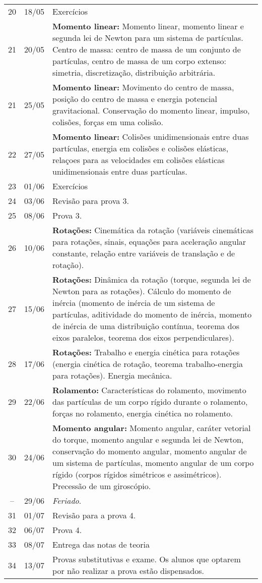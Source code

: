 \begin{center}
\begin{longtable}{ccp{70mm}}
 20 & 18/05 & Exercícios \\
 21 & 20/05 & \textbf{Momento linear:} Momento linear, momento linear e segunda lei de Newton para um sistema de partículas. Centro de massa: centro de massa de um conjunto de partículas, centro de massa de um corpo extenso: simetria, discretização, distribuição arbitrária. \\
 21 & 25/05 & \textbf{Momento linear:} Movimento do centro de massa, posição do centro de massa e energia potencial gravitacional. Conservação do momento linear, impulso, colisões, forças em uma colisão. \\
 22 & 27/05 & \textbf{Momento linear:} Colisões unidimensionais entre duas partículas, energia em colisões e colisões elásticas, relaçoes para as velocidades em colisões elásticas unidimensionais entre duas partículas. \\ 
 23 & 01/06 & Exercícios \\
 24 & 03/06 & Revisão para prova 3. \\
 25 & 08/06 & Prova 3. \\
 26 & 10/06 & \textbf{Rotações:} Cinemática da rotação (variáveis cinemáticas para rotações, sinais, equações para aceleração angular constante, relação entre variáveis de translação e de rotação). \\
 27 & 15/06 & \textbf{Rotações:} Dinâmica da rotação (torque, segunda lei de Newton para as rotações). Cálculo do momento de inércia (momento de inércia de um sistema de partículas, aditividade do momento de inércia, momento de inércia de uma distribuição contínua, teorema dos eixos paralelos, teorema dos eixos perpendiculares). \\
 28 & 17/06 & \textbf{Rotações:} Trabalho e energia cinética para rotações (energia cinética de rotação, teorema trabalho-energia para rotações). Energia mecânica. \\
 29 & 22/06 & \textbf{Rolamento:} Características do rolamento, movimento das partículas de um corpo rígido durante o rolamento, forças no rolamento, energia cinética no rolamento. \\
 30 & 24/06 & \textbf{Momento angular:} Momento angular, caráter vetorial do torque, momento angular e segunda lei de Newton, conservação do momento angular, momento angular de um sistema de partículas, momento angular de um corpo rígido (corpos rígidos simétricos e assimétricos). Precessão de um giroscópio. \\
 -- & 29/06 & \emph{Feriado}. \\
 31 & 01/07 & Revisão para a prova 4. \\
 32 & 06/07 & Prova 4. \\
 33 & 08/07 & Entrega das notas de teoria \\
 34 & 13/07 & Provas substitutivas e exame. Os alunos que optarem por não realizar a prova estão dispensados.
\end{longtable}
\end{center}
\cleardoublepage
